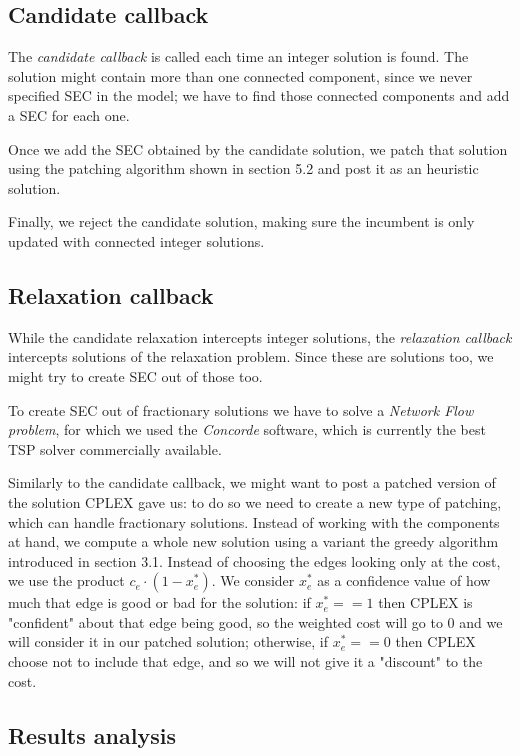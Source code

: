 \subsection{Candidate callback}
The \textit{candidate callback} is called each time an integer solution is found. The solution might contain more than one connected component, since we never specified SEC in the model; we have to find those connected components and add a SEC for each one.

Once we add the SEC obtained by the candidate solution, we patch that solution using the patching algorithm shown in section 5.2 and post it as an heuristic solution.

Finally, we reject the candidate solution, making sure the incumbent is only updated with connected integer solutions.

\subsection{Relaxation callback}
While the candidate relaxation intercepts integer solutions, the \textit{relaxation callback} intercepts solutions of the relaxation problem. Since these are solutions too, we might try to create SEC out of those too.

To create SEC out of fractionary solutions we have to solve a \textit{Network Flow problem}, for which we used the \textit{Concorde} software, which is currently the best TSP solver commercially available.

Similarly to the candidate callback, we might want to post a patched version of the solution CPLEX gave us: to do so we need to create a new type of patching, which can handle fractionary solutions. Instead of working with the components at hand, we compute a whole new solution using a variant the greedy algorithm introduced in section 3.1. Instead of choosing the edges looking only at the cost, we use the product $c_e \cdot (1 - x^*_e)$. We consider $x^*_e$ as a confidence value of how much that edge is good or bad for the solution: if $x^*_e == 1$ then CPLEX is "confident" about that edge being good, so the weighted cost will go to 0 and we will consider it in our patched solution; otherwise, if $x^*_e == 0$ then CPLEX choose not to include that edge, and so we will not give it a "discount" to the cost.

\subsection{Results analysis}

